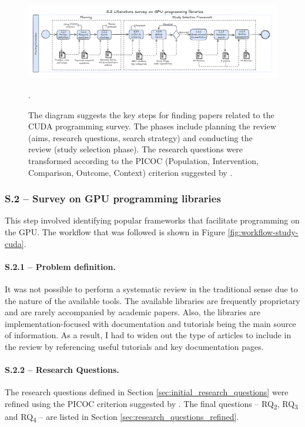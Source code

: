 \begin{figure}[th]
	\centering
	\includegraphics[width=\linewidth]{figures/survey-cuda3.pdf}
	\caption{The diagram suggests the key steps for finding papers related to the CUDA programming survey. The phases
		include planning the review (aims, research questions, search strategy) and conducting the review (study selection phase). The research questions
		were transformed according to the PICOC (Population, Intervention, Comparison, Outcome, Context) criterion suggested by \cite{keele_systematic_2007}.}.
	\label{fig:workflow-study-dnn}
\end{figure}
\subsubsection{S.2 -- Survey on GPU programming libraries}
\label{sec:gpu-programming-libraries}
This step involved identifying popular frameworks that facilitate programming on the GPU. The
workflow that was followed is shown in Figure \ref{fig:workflow-study-cuda}.

\paragraph{S.2.1 -- Problem definition.}
It was not possible to perform a systematic review in the traditional sense due to the nature of
the available tools. The available libraries are frequently proprietary and are rarely accompanied
by academic papers. Also, the libraries are implementation-focused with documentation and tutorials
being the main source of information. As a result, I had to widen out the type of articles to
include in the review by referencing useful tutorials and key documentation pages.

\paragraph{S.2.2 -- Research Questions.}
The research questions defined in Section \ref{sec:initial_research_questions} were refined using
the PICOC criterion suggested by \cite{keele_systematic_2007}. The final questions --
RQ\textsubscript{2}, RQ\textsubscript{3} and RQ\textsubscript{4} -- are listed in Section
\ref{sec:research_questions_refined}.

